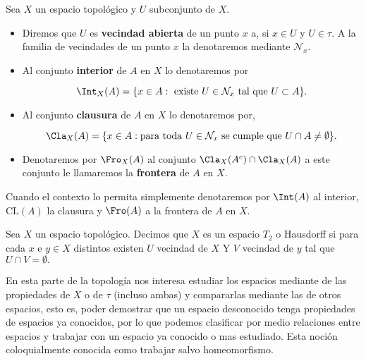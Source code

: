 \begin{df}
Sea $X$ un espacio topológico y $U$ subconjunto de $X$.

\begin{itemize}
	\item Diremos que $U$ es \textbf{vecindad abierta} de un punto $x$ a, si $x \in U$ y $U \in \tau$. A la familia de vecindades de un punto $x$ la denotaremos mediante $\mathcal{N}_x$.
	\item Al conjunto \textbf{interior} de $A$ en $X$ lo denotaremos por 
 
  $$\Int_X(A)=\{x \in A: \text{ existe } U \in \mathcal{N}_x \text{ tal que } U \subset A\}.$$
  
	\item  Al conjunto  \textbf{clausura} de $A$ en $X$ lo denotaremos por, 
  
$$\Cla_X(A)=\{x \in A: \text{para toda } U \in \mathcal{N}_x \text{ se cumple  que } U \cap A \neq \emptyset\}.$$
	
	\item Denotaremos por  $\Fro_X(A)$ al conjunto $\Cla_X(A^c) \cap \Cla_X(A) $ a este conjunto le llamaremos la 
  \textbf{frontera} de $A$ en $X$.
 \end{itemize}
\end{df}


\begin{cn}
Cuando el contexto lo permita simplemente denotaremos por $\Int(A)$ al interior, $\mathrm{CL}(A)$ la clausura y  $\Fro(A)$ a la frontera de $A$ en $X$.
\end{cn}

\begin{df}
Sea $X$ un espacio topológico. Decimos que $X$ es un espacio $T_2$ o Hausdorff si para cada $x$ e $y \in X$ distintos existen $U$ vecindad de $X$ Y $V$ vecindad de $y$ tal que $U \cap V = \emptyset.$
\end{df}

En esta parte de la topología nos interesa estudiar los espacios mediante de las propiedades de $X$ o de $\tau$ (incluso ambas) y compararlas mediante las de otros espacios, esto es, poder demostrar que un espacio desconocido tenga propiedades de espacios ya conocidos, por lo que podemos clasificar por medio relaciones entre espacios y trabajar con un espacio ya conocido o mas estudiado. Esta noción coloquialmente conocida como trabajar salvo homeomorfismo. 

